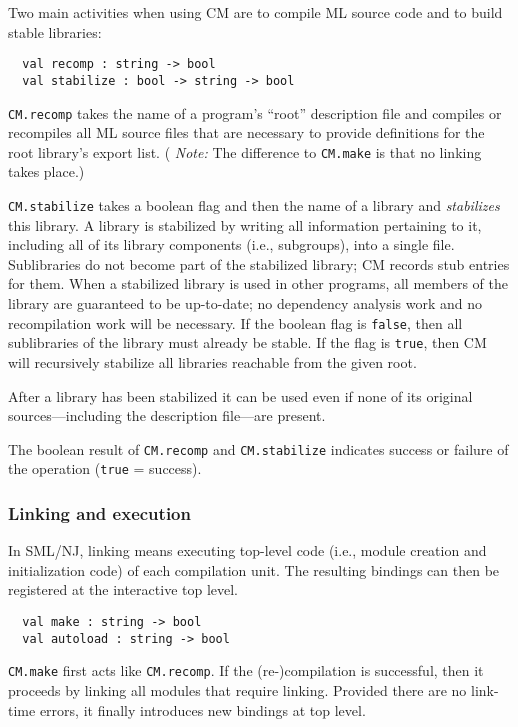 \documentclass[titlepage,letterpaper]{article}
\begin{document}
Two main activities when using CM are to compile ML source code and to
build stable libraries:

\begin{verbatim}
  val recomp : string -> bool
  val stabilize : bool -> string -> bool
\end{verbatim}

{\tt CM.recomp} takes the name of a program's ``root'' description
file and compiles or recompiles all ML source files that are necessary
to provide definitions for the root library's export list.  ({\em
Note:} The difference to {\tt CM.make} is that no linking takes
place.)

{\tt CM.stabilize} takes a boolean flag and then the name of a library
and {\em stabilizes} this library.  A library is stabilized by writing
all information pertaining to it, including all of its library
components (i.e., subgroups), into a single file.  Sublibraries do not
become part of the stabilized library; CM records stub entries for them.
When a stabilized library is used in other programs, all members of
the library are guaranteed to be up-to-date; no dependency analysis
work and no recompilation work will be necessary.  If the boolean flag
is {\tt false}, then all sublibraries of the library must already be
stable.  If the flag is {\tt true}, then CM will recursively stabilize
all libraries reachable from the given root.

After a library has been stabilized it can be used even if none of its
original sources---including the description file---are present.

The boolean result of {\tt CM.recomp} and {\tt CM.stabilize} indicates
success or failure of the operation ({\tt true} = success).

\subsubsection{Linking and execution}

In SML/NJ, linking means executing top-level code (i.e., module
creation and initialization code) of each compilation unit.  The
resulting bindings can then be registered at the interactive top
level.

\begin{verbatim}
  val make : string -> bool
  val autoload : string -> bool
\end{verbatim}

{\tt CM.make} first acts like {\tt CM.recomp}.  If the
(re-)compilation is successful, then it proceeds by linking all
modules that require linking.  Provided there are no link-time errors,
it finally introduces new bindings at top level.
\end{document}
